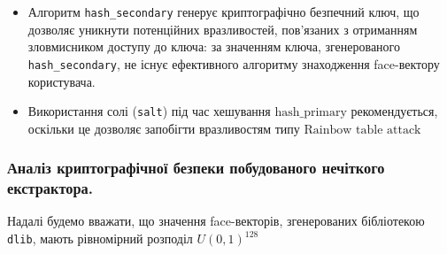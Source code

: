 \documentclass[11pt]{article}
\providecommand{\tightlist}{%
      \setlength{\itemsep}{0pt}\setlength{\parskip}{0pt}}
\begin{document}
\begin{itemize}
\begin{itemize}
    \begin{itemize}
    \tightlist
    \item
      Алгоритм \texttt{hash\_secondary} генерує криптографічно безпечний
      ключ, що дозволяє уникнути потенційних вразливостей, пов'язаних з
      отриманням зловмисником доступу до ключа: за значенням ключа,
      згенерованого \texttt{hash\_secondary}, не існує ефективного
      алгоритму знаходження face-вектору користувача.
    \item
      Використання солі (\texttt{salt}) під час хешування
      \(\text{hash_primary}\) рекомендується, оскільки це дозволяє
      запобігти вразливостям типу \(\text{Rainbow table attack}\)
    \end{itemize}
  \end{itemize}
\end{itemize}

    \hypertarget{ux430ux43dux430ux43bux456ux437-ux43aux440ux438ux43fux442ux43eux433ux440ux430ux444ux456ux447ux43dux43eux457-ux431ux435ux437ux43fux435ux43aux438-ux43fux43eux431ux443ux434ux43eux432ux430ux43dux43eux433ux43e-ux43dux435ux447ux456ux442ux43aux43eux433ux43e-ux435ux43aux441ux442ux440ux430ux43aux442ux43eux440ux430.}{%
\subsubsection{Аналіз криптографічної безпеки побудованого нечіткого
екстрактора.}\label{ux430ux43dux430ux43bux456ux437-ux43aux440ux438ux43fux442ux43eux433ux440ux430ux444ux456ux447ux43dux43eux457-ux431ux435ux437ux43fux435ux43aux438-ux43fux43eux431ux443ux434ux43eux432ux430ux43dux43eux433ux43e-ux43dux435ux447ux456ux442ux43aux43eux433ux43e-ux435ux43aux441ux442ux440ux430ux43aux442ux43eux440ux430.}}

Надалі будемо вважати, що значення face-векторів, згенерованих
бібліотекою \texttt{dlib}, мають рівномірний розподіл \(U(0,1)^{128}\)
\end{document}
